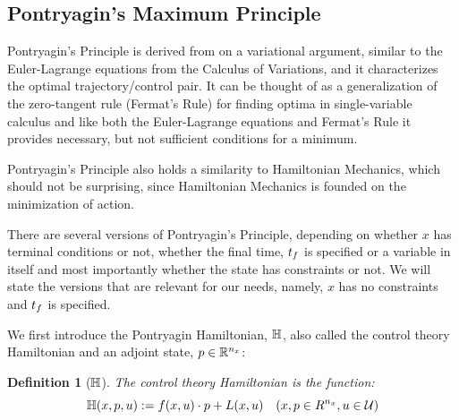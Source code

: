 \documentclass{article}
\newtheorem{defn}{Definition}[thm]
\begin{document}
\subsection{Pontryagin's Maximum Principle}
Pontryagin's Principle is derived from on a variational argument, similar to the
Euler-Lagrange equations from the Calculus of Variations, and it characterizes
the optimal trajectory/control pair. It can be thought of as a generalization of
the zero-tangent rule (Fermat's Rule) for finding optima in single-variable
calculus and like both the Euler-Lagrange equations and Fermat's Rule it
provides necessary, but not sufficient conditions for a minimum.

Pontryagin's Principle also holds a similarity to Hamiltonian Mechanics, which
should not be surprising, since Hamiltonian Mechanics is founded on
the minimization of action.

There are several versions of Pontryagin's Principle, depending on whether $x$ has
terminal conditions or not, whether the final time, ${ t_f }$ is specified or a
variable in itself and most importantly whether the state has constraints or
not. We will state the versions that are relevant for our needs, namely, $x$ has
no constraints and ${ t_f }$ is specified.

We first introduce the Pontryagin Hamiltonian, ${ \mathbb{H}}$, also called the control
theory Hamiltonian and an adjoint state, $p \in { \mathbb{R} }^{n_x}$:
\begin{defn} [${ \mathbb{H}}$] The control theory Hamiltonian is the function:
$$
{ \mathbb{H}}(x,p, u) := f(x,u) \cdot p + L(x,u) \quad (x,p \in R^{n_x}, u \in { \mathcal{U} })
$$ 
\end{defn}
\end{document}

